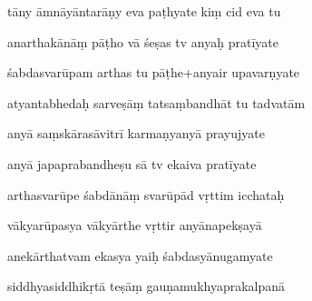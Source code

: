 \documentclass[article,12pt,a4paper]{memoir}%
\newcounter{parCount}
\begin{document}
	  
	  \pstart {} tāny āmnāyāntarāṇy eva paṭhyate kiṃ cid eva tu 
	{}
	\pend%
      

	  
	  \pstart \leavevmode%
	anarthakānāṃ pāṭho vā śeṣas tv anyaḥ pratīyate 
	{}
	\pend%
      

	  
	  \pstart {} śabdasvarūpam arthas tu pāṭhe+anyair upavarṇyate 
	{}
	\pend%
      

	  
	  \pstart \leavevmode%
	atyantabhedaḥ sarveṣāṃ tatsaṃbandhāt tu tadvatām 
	{}
	\pend%
      

	  
	  \pstart {} anyā saṃskārasāvitrī karmaṇyanyā prayujyate 
	{}
	\pend%
      

	  
	  \pstart \leavevmode%
	anyā japaprabandheṣu sā tv ekaiva pratīyate 
	{}
	\pend%
      

	  
	  \pstart {} arthasvarūpe śabdānāṃ svarūpād vṛttim icchataḥ 
	{}
	\pend%
      

	  
	  \pstart \leavevmode%
	vākyarūpasya vākyārthe vṛttir anyānapekṣayā 
	{}
	\pend%
      

	  
	  \pstart {} anekārthatvam ekasya yaiḥ śabdasyānugamyate 
	{}
	\pend%
      

	  
	  \pstart \leavevmode%
	siddhyasiddhikṛtā teṣāṃ gauṇamukhyaprakalpanā 
	{}
	\pend%
      
\end{document}
